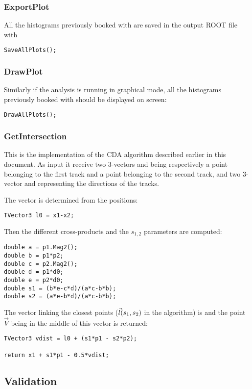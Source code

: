 \subsubsection{ExportPlot}
All the histograms previously booked with  are saved in the output ROOT file with

\begin{lstlisting}
SaveAllPlots();
\end{lstlisting} 

\subsubsection{DrawPlot}
Similarly if the analysis is running in graphical mode, all the histograms previously booked with
 should be displayed on screen:

\begin{lstlisting}
DrawAllPlots();
\end{lstlisting} 

\subsubsection{GetIntersection}\label{GetIntersection}
This is the implementation of the CDA algorithm described earlier in this document. As input it
receive two 3-vectors  and  being respectively a point belonging to the first track
and a point belonging to the second track, and two 3-vector  and  representing the
directions of the tracks.

The  vector is determined from the positions: 
\begin{lstlisting}
TVector3 l0 = x1-x2;
\end{lstlisting}
Then the different cross-products and the $s_{1,2}$ parameters are computed:
\begin{lstlisting}
double a = p1.Mag2();
double b = p1*p2;
double c = p2.Mag2();
double d = p1*d0;
double e = p2*d0;
double s1 = (b*e-c*d)/(a*c-b*b);
double s2 = (a*e-b*d)/(a*c-b*b);
\end{lstlisting}
The vector linking the closest points ($\vec{l}(s_1, s_2)$ in the algorithm) is  and the
point $\vec{V}$ being in the middle of this vector is returned:
\begin{lstlisting}
TVector3 vdist = l0 + (s1*p1 - s2*p2);

return x1 + s1*p1 - 0.5*vdist;
\end{lstlisting}

\subsection{Validation}

